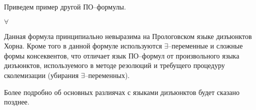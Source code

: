 
\begin{example}
Приведем пример другой ПО--формулы.

$\forall$

Данная формула принципиально невыразима на Прологовском языке дизъюнктов Хорна. Кроме того в данной формуле используются $\exists$--переменные и сложные формы консеквентов, что отличает язык ПО--формул от произвольного языка дизъюнктов, используемого в методе резолюций и требущего процедуру сколемизации (убирания $\exists$--переменных).
\end{example}

Более подробно об основных разлиячах с языками дизъюнктов будет сказано позднее.








